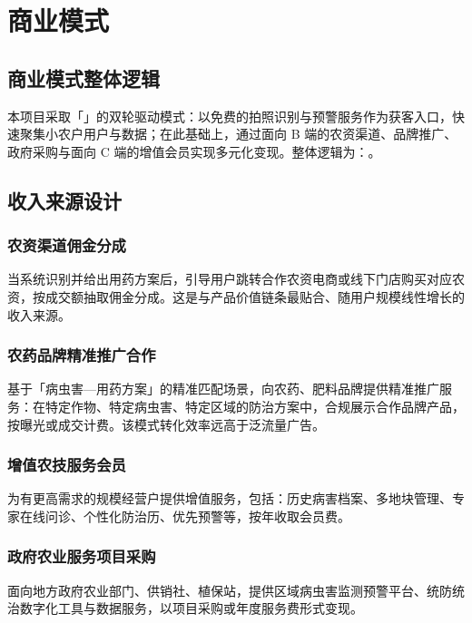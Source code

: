 \chapter{商业模式}

\section{商业模式整体逻辑}

本项目采取「」的双轮驱动模式：以免费的拍照识别与预警服务作为获客入口，快速聚集小农户用户与数据；在此基础上，通过面向 B 端的农资渠道、品牌推广、政府采购与面向 C 端的增值会员实现多元化变现。整体逻辑为：。

\section{收入来源设计}

\subsection{农资渠道佣金分成}

当系统识别并给出用药方案后，引导用户跳转合作农资电商或线下门店购买对应农资，按成交额抽取佣金分成。这是与产品价值链条最贴合、随用户规模线性增长的收入来源。

\subsection{农药品牌精准推广合作}

基于「病虫害—用药方案」的精准匹配场景，向农药、肥料品牌提供精准推广服务：在特定作物、特定病虫害、特定区域的防治方案中，合规展示合作品牌产品，按曝光或成交计费。该模式转化效率远高于泛流量广告。

\subsection{增值农技服务会员}

为有更高需求的规模经营户提供增值服务，包括：历史病害档案、多地块管理、专家在线问诊、个性化防治历、优先预警等，按年收取会员费。

\subsection{政府农业服务项目采购}

面向地方政府农业部门、供销社、植保站，提供区域病虫害监测预警平台、统防统治数字化工具与数据服务，以项目采购或年度服务费形式变现。

